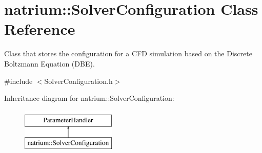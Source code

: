 \hypertarget{classnatrium_1_1SolverConfiguration}{\section{natrium\-:\-:Solver\-Configuration Class Reference}
\label{classnatrium_1_1SolverConfiguration}
}


Class that stores the configuration for a C\-F\-D simulation based on the Discrete Boltzmann Equation (D\-B\-E).  




{\ttfamily \#include $<$Solver\-Configuration.\-h$>$}

Inheritance diagram for natrium\-:\-:Solver\-Configuration\-:\begin{figure}[H]
\begin{center}
\leavevmode
\includegraphics[height=2.000000cm]{classnatrium_1_1SolverConfiguration}
\end{center}
\end{figure}
